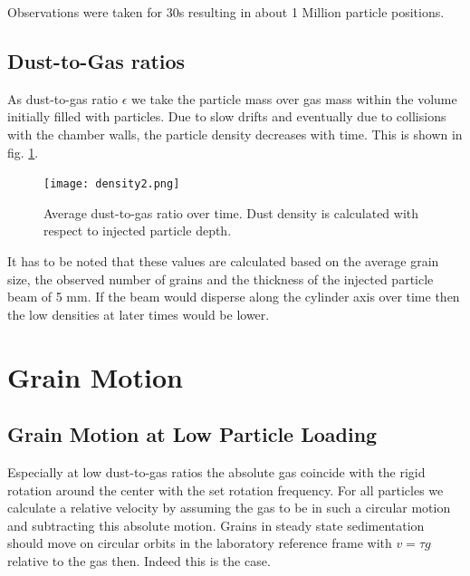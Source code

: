 Observations were taken for 30s resulting in about 1 Million
particle positions.

\subsection{Dust-to-Gas ratios}

As dust-to-gas ratio $\epsilon$ we take the particle mass over gas mass within the volume initially filled with particles. 
Due to slow drifts and eventually due to collisions with the chamber walls, the particle
density decreases with time. This is shown in fig. \ref{fig.dtog}.

\begin{figure}[h]
\texttt{[image: density2.png]}
    \caption{\label{fig.dtog}Average dust-to-gas ratio over time. Dust density is calculated with respect to injected particle depth.}
\end{figure}

It has to be noted that these values are calculated based on the average grain size, the observed number of grains and the thickness of the injected particle beam of 5 mm.
If the beam would disperse along the cylinder axis over time then the low densities at later times would be lower. 


\section{Grain Motion}

\subsection{Grain Motion at Low Particle Loading}

Especially at low dust-to-gas ratios the absolute gas coincide with the rigid rotation around the center with the set rotation frequency.
For all particles we calculate a relative velocity by assuming the gas to be in such a circular motion and subtracting this absolute motion.
Grains in steady state sedimentation should move on circular orbits in the laboratory 
reference frame with $v = \tau g$ relative to the gas then. Indeed this is the case. 

